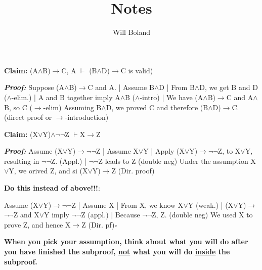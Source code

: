 \documentclass{article}
\begin{document}
\title{Notes}
\author{Will Boland}
\maketitle

\textbf{Claim: }(A$\wedge$B)$\rightarrow$C, A $\vdash$ (B$\wedge$D)$\rightarrow$C is valid)\newline

\textbf{\textit{Proof:}}\newline
Suppose (A$\wedge$B)$\rightarrow$C and A.\newline
|	Assume B$\wedge$D\newline
|	From B$\wedge$D, we get B and D ($\wedge$-elim.)\newline
|	A and B together imply A$\wedge$B ($\wedge$-intro)\newline
|	We have (A$\wedge$B)$\rightarrow$C and A$\wedge$B, so C ($\rightarrow$-elim)\newline
Assuming B$\wedge$D, we proved C and therefore (B$\wedge$D)$\rightarrow$C. (direct proof or $\rightarrow$-introduction)\newline\newline

\textbf{Claim: } (X$\lor$Y)$\wedge$$\neg$$\neg$Z $\vdash $X$\rightarrow$Z\newline

\textbf{\textit{Proof:}}\newline
Assume (X$\lor$Y)$\rightarrow$$\neg$$\neg$Z\newline
|	Assume X$\lor$Y\newline
|	Apply (X$\lor$Y)$\rightarrow$$\neg$$\neg$Z, to X$\lor$Y, resulting in $\neg$$\neg$Z. (Appl.)\newline
|	$\neg$$\neg$Z leads to Z (double neg)\newline
Under the assumption X$\lor$Y, we orived Z, and si (X$\lor$Y)$\rightarrow$Z (Dir. proof)\newline\newline

\textbf{Do this instead of above!!!}:\newline\newline

Assume (X$\lor$Y)$\rightarrow$$\neg$$\neg$Z\newline
|	Assume X\newline
|	From X, we know X$\lor$Y (weak.)\newline
|	(X$\lor$Y)$\rightarrow$$\neg$$\neg$Z and X$\lor$Y imply $\neg$$\neg$Z (appl.)\newline
|	Because $\neg$$\neg$Z, Z. (double neg)\newline
We used X to prove Z, and hence X$\rightarrow$Z (Dir. pf)$\square$

\textbf{When you pick your assumption, think about what you will do after you have finished the subproof, \underline{not} what you will do \underline{inside} the subproof.}\newline
\end{document}
